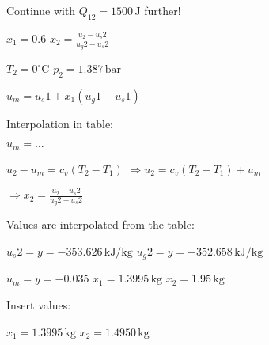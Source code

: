 Continue with \( Q_{12} = 1500 \, \text{J} \) further!  

\( x_1 = 0.6 \)  
\( x_2 = \frac{u_2 - u_s2}{u_g2 - u_s2} \)  

\( T_2 = 0^\circ \text{C} \)  
\( p_2 = 1.387 \, \text{bar} \)  

\( u_m = u_s1 + x_1 (u_g1 - u_s1) \)  

Interpolation in table:  

\( u_m = \ldots \)  

\( u_2 - u_m = c_v (T_2 - T_1) \)  
\( \Rightarrow u_2 = c_v (T_2 - T_1) + u_m \)  

\( \Rightarrow x_2 = \frac{u_2 - u_s2}{u_g2 - u_s2} \)  

Values are interpolated from the table:  

\( u_s2 = y = -353.626 \, \text{kJ/kg} \)  
\( u_g2 = y = -352.658 \, \text{kJ/kg} \)  

\( u_m = y = -0.035 \)  
\( x_1 = 1.3995 \, \text{kg} \)  
\( x_2 = 1.95 \, \text{kg} \)  

Insert values:  

\( x_1 = 1.3995 \, \text{kg} \)  
\( x_2 = 1.4950 \, \text{kg} \)
